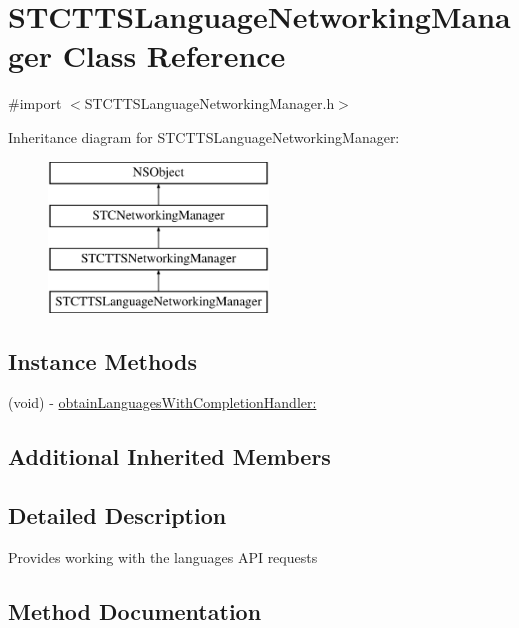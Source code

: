 \hypertarget{interface_s_t_c_t_t_s_language_networking_manager}{}\section{S\+T\+C\+T\+T\+S\+Language\+Networking\+Manager Class Reference}
\label{interface_s_t_c_t_t_s_language_networking_manager}


{\ttfamily \#import $<$S\+T\+C\+T\+T\+S\+Language\+Networking\+Manager.\+h$>$}

Inheritance diagram for S\+T\+C\+T\+T\+S\+Language\+Networking\+Manager\+:\begin{figure}[H]
\begin{center}
\leavevmode
\includegraphics[height=4.000000cm]{interface_s_t_c_t_t_s_language_networking_manager}
\end{center}
\end{figure}
\subsection*{Instance Methods}
\begin{DoxyCompactItemize}
\item 
(void) -\/ \hyperlink{interface_s_t_c_t_t_s_language_networking_manager_a0d2d37f342a34a5f566c5054acc0b77e}{obtain\+Languages\+With\+Completion\+Handler\+:}
\end{DoxyCompactItemize}
\subsection*{Additional Inherited Members}


\subsection{Detailed Description}
Provides working with the languages A\+PI requests 

\subsection{Method Documentation}
\hypertarget{interface_s_t_c_t_t_s_language_networking_manager_a0d2d37f342a34a5f566c5054acc0b77e}{}\label{interface_s_t_c_t_t_s_language_networking_manager_a0d2d37f342a34a5f566c5054acc0b77e} 
